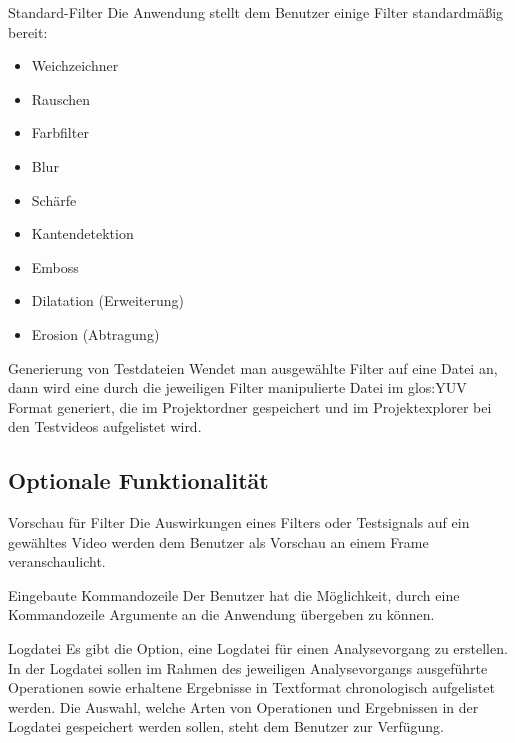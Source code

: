  Standard-Filter
\newline
Die Anwendung stellt dem Benutzer einige Filter standardmäßig bereit:
\begin{itemize}
\item Weichzeichner
\item Rauschen
\item Farbfilter
\item Blur
\item Schärfe
\item Kantendetektion
\item Emboss
\item Dilatation (Erweiterung)
\item Erosion (Abtragung)

\end{itemize}

 Generierung von Testdateien
\newline
Wendet man ausgewählte Filter auf eine Datei an, dann wird eine durch die jeweiligen Filter manipulierte Datei im \gls{glos:YUV} Format generiert, die im Projektordner gespeichert und im Projektexplorer bei den Testvideos aufgelistet wird.





\subsection{Optionale Funktionalität}

 Vorschau für Filter
\newline
Die Auswirkungen eines Filters oder Testsignals auf ein gewähltes Video werden dem Benutzer als Vorschau an einem Frame veranschaulicht.


 Eingebaute Kommandozeile
\newline
Der Benutzer hat die Möglichkeit, durch eine Kommandozeile Argumente an die Anwendung übergeben zu können.

 Logdatei
\newline
Es gibt die Option, eine Logdatei für einen Analysevorgang zu erstellen. In der Logdatei sollen im Rahmen
 des jeweiligen Analysevorgangs ausgeführte Operationen sowie erhaltene Ergebnisse in Textformat
  chronologisch aufgelistet werden. Die Auswahl, welche Arten von Operationen und Ergebnissen in der
   Logdatei gespeichert werden sollen, steht dem Benutzer zur Verfügung.
